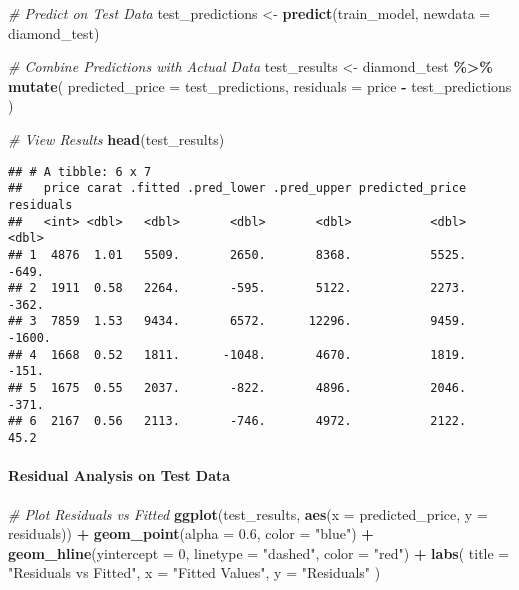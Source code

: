 \documentclass[
]{article}
\newenvironment{Shaded}{\begin{snugshade}}{\end{snugshade}}
\newcommand{\AttributeTok}[1]{\textcolor[rgb]{0.13,0.29,0.53}{#1}}
\newcommand{\CommentTok}[1]{\textcolor[rgb]{0.56,0.35,0.01}{\textit{#1}}}
\newcommand{\DecValTok}[1]{\textcolor[rgb]{0.00,0.00,0.81}{#1}}
\newcommand{\FloatTok}[1]{\textcolor[rgb]{0.00,0.00,0.81}{#1}}
\newcommand{\FunctionTok}[1]{\textcolor[rgb]{0.13,0.29,0.53}{\textbf{#1}}}
\newcommand{\NormalTok}[1]{#1}
\newcommand{\OtherTok}[1]{\textcolor[rgb]{0.56,0.35,0.01}{#1}}
\newcommand{\SpecialCharTok}[1]{\textcolor[rgb]{0.81,0.36,0.00}{\textbf{#1}}}
\newcommand{\StringTok}[1]{\textcolor[rgb]{0.31,0.60,0.02}{#1}}
\begin{document}
\begin{Shaded}
\begin{Highlighting}[]
\CommentTok{\# Predict on Test Data}
\NormalTok{test\_predictions }\OtherTok{\textless{}{-}} \FunctionTok{predict}\NormalTok{(train\_model, }\AttributeTok{newdata =}\NormalTok{ diamond\_test)}

\CommentTok{\# Combine Predictions with Actual Data}
\NormalTok{test\_results }\OtherTok{\textless{}{-}}\NormalTok{ diamond\_test }\SpecialCharTok{\%\textgreater{}\%}
  \FunctionTok{mutate}\NormalTok{(}
    \AttributeTok{predicted\_price =}\NormalTok{ test\_predictions,}
    \AttributeTok{residuals =}\NormalTok{ price }\SpecialCharTok{{-}}\NormalTok{ test\_predictions}
\NormalTok{  )}

\CommentTok{\# View Results}
\FunctionTok{head}\NormalTok{(test\_results)}
\end{Highlighting}
\end{Shaded}

\begin{verbatim}
## # A tibble: 6 x 7
##   price carat .fitted .pred_lower .pred_upper predicted_price residuals
##   <int> <dbl>   <dbl>       <dbl>       <dbl>           <dbl>     <dbl>
## 1  4876  1.01   5509.       2650.       8368.           5525.    -649. 
## 2  1911  0.58   2264.       -595.       5122.           2273.    -362. 
## 3  7859  1.53   9434.       6572.      12296.           9459.   -1600. 
## 4  1668  0.52   1811.      -1048.       4670.           1819.    -151. 
## 5  1675  0.55   2037.       -822.       4896.           2046.    -371. 
## 6  2167  0.56   2113.       -746.       4972.           2122.      45.2
\end{verbatim}

\paragraph{Residual Analysis on Test
Data}\label{residual-analysis-on-test-data}

\begin{Shaded}
\begin{Highlighting}[]
\CommentTok{\# Plot Residuals vs Fitted}
\FunctionTok{ggplot}\NormalTok{(test\_results, }\FunctionTok{aes}\NormalTok{(}\AttributeTok{x =}\NormalTok{ predicted\_price, }\AttributeTok{y =}\NormalTok{ residuals)) }\SpecialCharTok{+}
  \FunctionTok{geom\_point}\NormalTok{(}\AttributeTok{alpha =} \FloatTok{0.6}\NormalTok{, }\AttributeTok{color =} \StringTok{"blue"}\NormalTok{) }\SpecialCharTok{+}
  \FunctionTok{geom\_hline}\NormalTok{(}\AttributeTok{yintercept =} \DecValTok{0}\NormalTok{, }\AttributeTok{linetype =} \StringTok{"dashed"}\NormalTok{, }\AttributeTok{color =} \StringTok{"red"}\NormalTok{) }\SpecialCharTok{+}
  \FunctionTok{labs}\NormalTok{(}
    \AttributeTok{title =} \StringTok{"Residuals vs Fitted"}\NormalTok{,}
    \AttributeTok{x =} \StringTok{"Fitted Values"}\NormalTok{,}
    \AttributeTok{y =} \StringTok{"Residuals"}
\NormalTok{  )}
\end{Highlighting}
\end{Shaded}
\end{document}
